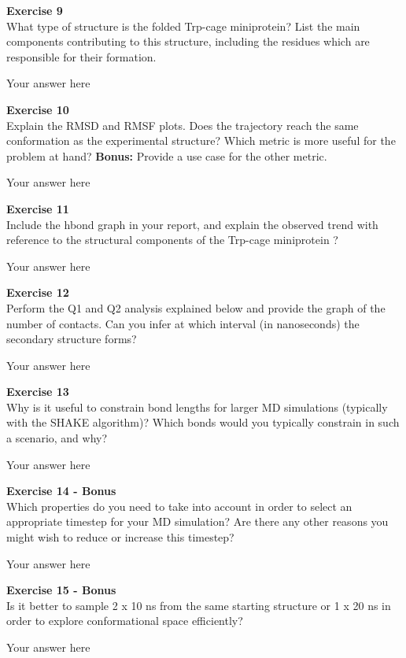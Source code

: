 \documentclass{article}
\begin{document}
\begin{mdframed}
\textbf{Exercise 9}\\
What type of structure is the folded Trp-cage miniprotein? List the main components contributing to this structure, including the residues which are responsible for their formation.
\end{mdframed}

Your answer here

\begin{mdframed}
\textbf{Exercise 10}\\
Explain the RMSD and RMSF plots.  Does the trajectory reach the same conformation as the experimental structure?
Which metric is more useful for the problem at hand? \textbf{Bonus:}  Provide a use case for the other metric.
\end{mdframed}

Your answer here

\begin{mdframed}
\textbf{Exercise 11}\\
Include the hbond graph in your report, and explain the observed trend with reference to the structural components of the Trp-cage miniprotein ?
\end{mdframed}

Your answer here

\begin{mdframed}
\textbf{Exercise 12}\\
Perform the Q1 and Q2 analysis explained below and provide the graph of the number of contacts. Can you infer at which interval (in nanoseconds) the secondary structure forms?
\end{mdframed}

Your answer here

\begin{mdframed}
\textbf{Exercise 13}\\
Why is it useful to constrain bond lengths for larger MD simulations (typically with the SHAKE algorithm)? Which bonds would you typically constrain in such a scenario, and why?
\end{mdframed}

Your answer here

\begin{mdframed}
\textbf{Exercise 14 - Bonus}\\
Which properties do you need to take into account in order to select an appropriate timestep for your MD simulation? Are there any other reasons you might wish to reduce or increase this timestep?
\end{mdframed}

Your answer here

\begin{mdframed}
\textbf{Exercise 15 - Bonus}\\
Is it better to sample 2 x 10 ns from the same starting structure or 1 x 20 ns in order to explore conformational space efficiently?
\end{mdframed}

Your answer here
\end{document}
